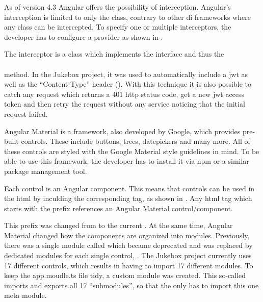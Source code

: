 As of version 4.3 Angular offers the possibility of interception. Angular's interception is limited to only the  class, contrary to other \gls{di} frameworks where any class can be intercepted. To specify one or multiple interceptors, the developer has to configure a provider as shown in .


The interceptor is a class which implements the  interface and thus the \\  \\ method. In the Jukebox project, it was used to automatically include a \gls{jwt} as well as the \enquote{Content-Type} header (). With this technique it is also possible to catch any request which returns a 401 \gls{http} status code, get a new \gls{jwt} access token and then retry the request without any service noticing that the initial request failed.



Angular Material is a framework, also developed by Google, which provides pre-built controls. These include buttons, trees, datepickers and many more. All of these controls are styled with the Google Material style guidelines in mind. To be able to use this framework, the developer has to install it via \gls{npm} or a similar package management tool. \cite{angularMaterial}

Each control is an Angular component. This means that controls can be used in the \gls{html} by inculding the corresponding tag, as shown in . Any \gls{html} tag which starts with the  prefix references an Angular Material control/component.

This prefix was changed from  to the current . At the same time, Angular Material changed how the components are organized into modules. Previously, there was a single module called  which became deprecated and was replaced by dedicated modules for each single control, \zB {}. The Jukebox project currently uses 17 different controls, which results in having to import 17 different modules. To keep the app.moudle.ts file tidy, a custom module was created. This so-called  imports and exports all 17 \enquote{submodules}, so that the  only has to import this one meta module.

